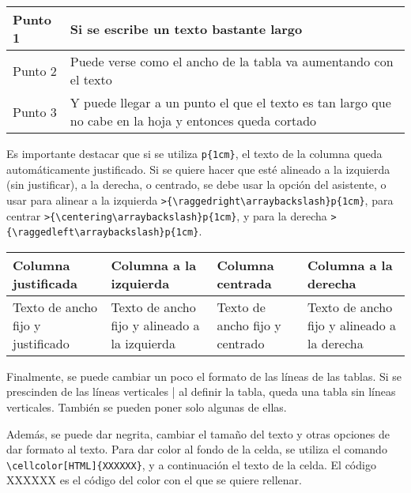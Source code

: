 \begin{center}
	\begin{tabular}{|p{2cm}|p{10cm}|}
	\hline 
	Punto 1 & Si se escribe un texto bastante largo \\ 
	\hline 
	Punto 2 & Puede verse como el ancho de la tabla va aumentando con el texto \\ 
	\hline 
	Punto 3 & Y puede llegar a un punto el que el texto es tan largo que no cabe en la hoja y entonces queda cortado \\ 
	\hline 
\end{tabular} 
\end{center}

Es importante destacar que si se utiliza \verb!p{1cm}!, el texto de la columna queda automáticamente justificado. Si se quiere hacer que esté alineado a la izquierda (sin justificar), a la derecha, o centrado, se debe usar la opción del asistente, o usar para alinear a la izquierda \verb!>{\raggedright\arraybackslash}p{1cm}!, para centrar \verb!>{\centering\arraybackslash}p{1cm}!, y para la derecha \verb!>{\raggedleft\arraybackslash}p{1cm}!.

\begin{center}
	\begin{tabular}{|p{2.5cm}|>{\raggedright\arraybackslash}p{2.5cm}|>{\centering\arraybackslash}p{2.5cm}|>{\raggedleft\arraybackslash}p{2.5cm}|}
	\hline 
	Columna justificada & Columna a la izquierda & Columna centrada & Columna a la derecha \\ 
	\hline 
	Texto de ancho fijo y justificado & Texto de ancho fijo y alineado a la izquierda & Texto de ancho fijo y centrado & Texto de ancho fijo y alineado a la derecha \\ 
	\hline 
\end{tabular} 
\end{center}

Finalmente, se puede cambiar un poco el formato de las líneas de las tablas. Si se prescinden de las líneas verticales | al definir la tabla, queda una tabla sin líneas verticales. También se pueden poner solo algunas de ellas.

Además, se puede dar negrita, cambiar el tamaño del texto y otras opciones de dar formato al texto. Para dar color al fondo de la celda, se utiliza el comando \verb!\cellcolor[HTML]{XXXXXX}!, y a continuación el texto de la celda. El código XXXXXX es el código del color con el que se quiere rellenar.

